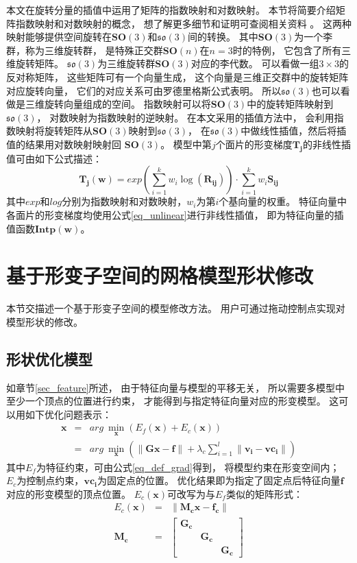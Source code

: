 本文在旋转分量的插值中运用了矩阵的指数映射和对数映射。
本节将简要介绍矩阵指数映射和对数映射的概念，
想了解更多细节和证明可查阅相关资料\cite{murray2017mathematical}
\cite{trove.nla.gov.au/work/222715717}。
这两种映射能够提供空间旋转在$\bm{SO}(3)$和$\mathfrak{so}(3)$间的转换。
其中$\bm{SO}(3)$为一个李群，称为三维旋转群，
是特殊正交群$\bm{SO}(n)$在$n=3$时的特例，
它包含了所有三维旋转矩阵。
$\mathfrak{so}(3)$为三维旋转群$\bm{SO}(3)$对应的李代数。
可以看做一组$3 \times 3$的反对称矩阵，
这些矩阵可有一个向量生成，
这个向量是三维正交群中的旋转矩阵对应旋转向量，
它们的对应关系可由罗德里格斯公式表明。
所以$\mathfrak{so}(3)$也可以看做是三维旋转向量组成的空间。
指数映射可以将$\bm{SO}(3)$中的旋转矩阵映射到$\mathfrak{so}(3)$，
对数映射为指数映射的逆映射。
在本文采用的插值方法中，
会利用指数映射将旋转矩阵从$\bm{SO}(3)$映射到$\mathfrak{so}(3)$，
在$\mathfrak{so}(3)$中做线性插值，然后将插值的结果用对数映射映射回
$\bm{SO}(3)$。
模型中第$j$个面片的形变梯度$\bm{T_j}$的非线性插值可由如下公式描述：
\begin{equation}
    \label{eq_unlinear}
    \bm{T_j}(\bm{w})
    =
        exp(\sum_{i=1}^{k}w_i\log (\bm{R_{ij}}))
        \cdot
        \sum_{i=1}^{k}w_i\bm{S_{ij}}
\end{equation}
其中$exp$和$log$分别为指数映射和对数映射，$w_i$为第$i$个基向量的权重。
特征向量中各面片的形变梯度均使用公式\ref{eq_unlinear}进行非线性插值，
即为特征向量的插值函数$\bm{Intp}(\bm{w})$。
\section{基于形变子空间的网格模型形状修改}
本节交描述一个基于形变子空间的模型修改方法。
用户可通过拖动控制点实现对模型形状的修改。
\subsection{形状优化模型}
如章节\ref{sec_feature}所述，
由于特征向量与模型的平移无关，
所以需要多模型中至少一个顶点的位置进行约束，
才能得到与指定特征向量对应的形变模型。
这可以用如下优化问题表示：
\begin{eqnarray}
    \bm{x}&=&arg\ \min_{\bm{x}} (E_f(\bm{x}) + E_c(\bm{x})) \nonumber \\
          &=&arg\ \min_{\bm{x}} (\|\bm{Gx}-\bm{f}\| + \lambda_c  \sum_{i=1}^{l}\|\bm{v_i}-\bm{vc_i}\|)
\end{eqnarray}
其中$E_f$为特征约束，可由公式\ref{eq_def_grad}得到，
将模型约束在形变空间内；
$E_c$为控制点约束，$\bm{vc_i}$为固定点的位置。
优化结果即为指定了固定点后特征向量$\bm{f}$对应的形变模型的顶点位置。
$E_c(\bm{x})$可改写为与$E_f$类似的矩阵形式：
\begin{eqnarray}
    E_c(\bm{x})&=&\|\bm{
        \bm{M_c}x}
        -
        \bm{f_c}\| \nonumber \\
    \bm{M_c}&=&
    \begin{bmatrix}
        \bm{G_c} &        & \\ 
         &       \bm{G_c} & \\ 
         &       &        \bm{G_c}
    \end{bmatrix}
\end{eqnarray}

